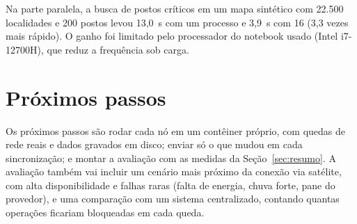 \documentclass[a4paper,12pt]{article}
\begin{document}
Na parte paralela, a busca de postos críticos em um mapa sintético com 22.500
localidades e 200 postos levou 13,0~s com um processo e 3,9~s com 16 (3,3
vezes mais rápido). O ganho foi limitado pelo processador do notebook usado
(Intel i7-12700H), que reduz a frequência sob carga.

\section{Próximos passos}
\label{sec:discussao}

Os próximos passos são rodar cada nó em um contêiner próprio, com
quedas de rede reais e dados gravados em disco; enviar só o que mudou em cada
sincronização; e montar a avaliação com as medidas da
Seção~\ref{sec:resumo}. A avaliação também vai incluir um cenário mais
próximo da conexão via satélite, com alta disponibilidade e falhas raras
(falta de energia, chuva forte, pane do provedor), e uma comparação com um
sistema centralizado, contando quantas operações ficariam bloqueadas em cada
queda.
\end{document}
